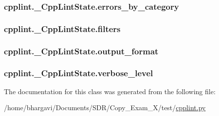 \subsubsection[{\texorpdfstring{errors\+\_\+by\+\_\+category}{errors_by_category}}]{\setlength{\rightskip}{0pt plus 5cm}cpplint.\+\_\+\+Cpp\+Lint\+State.\+errors\+\_\+by\+\_\+category}\hypertarget{classcpplint_1_1___cpp_lint_state_afb33527113706b5fcae07d680d8cec99}{}\label{classcpplint_1_1___cpp_lint_state_afb33527113706b5fcae07d680d8cec99}
\subsubsection[{\texorpdfstring{filters}{filters}}]{\setlength{\rightskip}{0pt plus 5cm}cpplint.\+\_\+\+Cpp\+Lint\+State.\+filters}\hypertarget{classcpplint_1_1___cpp_lint_state_a8443105b9623383ab75fa242009c006e}{}\label{classcpplint_1_1___cpp_lint_state_a8443105b9623383ab75fa242009c006e}
\subsubsection[{\texorpdfstring{output\+\_\+format}{output_format}}]{\setlength{\rightskip}{0pt plus 5cm}cpplint.\+\_\+\+Cpp\+Lint\+State.\+output\+\_\+format}\hypertarget{classcpplint_1_1___cpp_lint_state_a5c68ca79b0ff9b2fba1c488a7b2bd3f0}{}\label{classcpplint_1_1___cpp_lint_state_a5c68ca79b0ff9b2fba1c488a7b2bd3f0}
\subsubsection[{\texorpdfstring{verbose\+\_\+level}{verbose_level}}]{\setlength{\rightskip}{0pt plus 5cm}cpplint.\+\_\+\+Cpp\+Lint\+State.\+verbose\+\_\+level}\hypertarget{classcpplint_1_1___cpp_lint_state_a94328754c2f7481f4da9757a9dede308}{}\label{classcpplint_1_1___cpp_lint_state_a94328754c2f7481f4da9757a9dede308}


The documentation for this class was generated from the following file\+:\begin{DoxyCompactItemize}
\item 
/home/bhargavi/\+Documents/\+S\+D\+R/\+Copy\+\_\+\+Exam\+\_\+X/test/\hyperlink{cpplint_8py}{cpplint.\+py}\end{DoxyCompactItemize}
